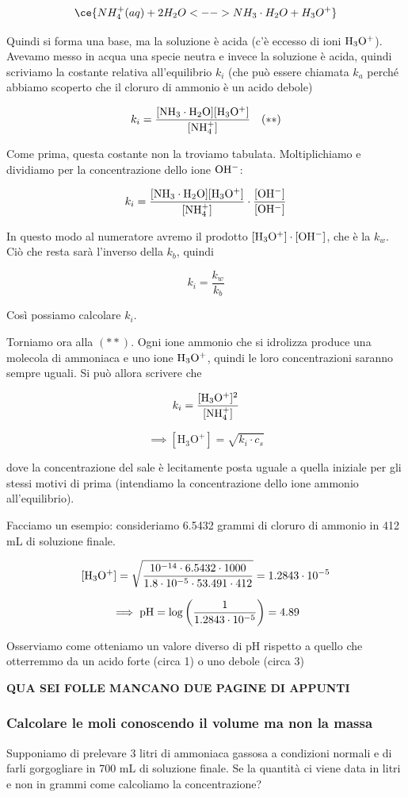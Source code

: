 $$\ce{NH_4^+(aq) + 2H_2O <--> NH_3 \cdot H_2O + H_3O^+}$$

Quindi si forma una base, ma la soluzione è acida (c'è eccesso di ioni $\rm H_3O^+$). Avevamo messo in acqua una specie neutra e invece la soluzione è acida, quindi scriviamo la costante relativa all'equilibrio $k_i$ (che può essere chiamata $k_a$ perché abbiamo scoperto che il cloruro di ammonio è un acido debole)

$$k_i=\rm \frac{[NH_3 \cdot H_2O][H_3O^+]}{[NH_4^+]} \quad (**)$$

Come prima, questa costante non la troviamo tabulata. Moltiplichiamo e dividiamo per la concentrazione dello ione $\rm OH^-$:

$$k_i=\rm \frac{[NH_3 \cdot H_2O][H_3O^+]}{[NH_4^+]} \cdot \frac{[OH^-]}{[OH^-]}$$

In questo modo al numeratore avremo il prodotto $\rm [H_3O^+] \cdot [OH^-]$, che è la $k_w$. Ciò che resta sarà l'inverso della $k_b$, quindi

$$k_i=\frac{k_w}{k_b}$$

Così possiamo calcolare $k_i$.

Torniamo ora alla $(**)$. Ogni ione ammonio che si idrolizza produce una molecola di ammoniaca e uno ione $\rm H_3O^+$, quindi le loro concentrazioni saranno sempre uguali. Si può allora scrivere che

$$k_i=\rm \frac{[H_3O^+]^2}{[NH_4^+]}$$

$$\implies [\text{H}_3\text{O}^+]=\sqrt{k_i \cdot c_s}$$

dove la concentrazione del sale è lecitamente posta uguale a quella iniziale per gli stessi motivi di prima (intendiamo la concentrazione dello ione ammonio all'equilibrio).

\vspace{0.2cm}Facciamo un esempio: consideriamo 6.5432 grammi di cloruro di ammonio in 412 mL di soluzione finale.

$$\rm [H_3O^+]=\sqrt{\frac{10^{-14} \cdot 6.5432 \cdot 1000}{1.8 \cdot 10^{-5} \cdot 53.491 \cdot 412}}=1.2843 \cdot 10^{-5}$$

$$\implies \rm pH=\log{\left( \frac{1}{1.2843 \cdot 10^{-5}} \right)}=4.89$$

Osserviamo come otteniamo un valore diverso di pH rispetto a quello che otterremmo da un acido forte (circa 1) o uno debole (circa 3)

\textbf{QUA SEI FOLLE MANCANO DUE PAGINE DI APPUNTI}
\subsubsection{Calcolare le moli conoscendo il volume ma non la massa}
Supponiamo di prelevare 3 litri di ammoniaca gassosa a condizioni normali e di farli gorgogliare in 700 mL di soluzione finale. Se la quantità ci viene data in litri e non in grammi come calcoliamo la concentrazione?

